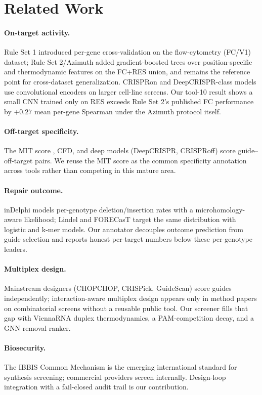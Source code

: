 \documentclass[12pt]{article}
\begin{document}
\section{Related Work}
\paragraph{On-target activity.} Rule Set 1 \cite{doench2014} introduced
per-gene cross-validation on the flow-cytometry (FC/V1) dataset; Rule Set
2/Azimuth \cite{doench2016} added gradient-boosted trees over position-specific
and thermodynamic features on the FC+RES union, and remains the reference
point for cross-dataset generalization. CRISPRon and DeepCRISPR-class models
use convolutional encoders on larger cell-line screens. Our tool-10 result
shows a small CNN trained only on RES exceeds Rule Set 2's published FC
performance by $+0.27$ mean per-gene Spearman under the Azimuth protocol
itself.
\paragraph{Off-target specificity.} The MIT score \cite{hsu2013}, CFD, and
deep models (DeepCRISPR, CRISPRoff) score guide--off-target pairs. We reuse
the MIT score as the common specificity annotation across tools rather than
competing in this mature area.
\paragraph{Repair outcome.} inDelphi \cite{shen2018} models per-genotype
deletion/insertion rates with a microhomology-aware likelihood; Lindel
\cite{chen2019} and FORECasT target the same distribution with logistic and
k-mer models. Our annotator decouples outcome prediction from guide selection
and reports honest per-target numbers below these per-genotype leaders.
\paragraph{Multiplex design.} Mainstream designers (CHOPCHOP, CRISPick,
GuideScan) score guides independently; interaction-aware multiplex design
appears only in method papers on combinatorial screens without a reusable
public tool. Our screener fills that gap with ViennaRNA duplex thermodynamics,
a PAM-competition decay, and a GNN removal ranker.
\paragraph{Biosecurity.} The IBBIS Common Mechanism is the emerging
international standard for synthesis screening; commercial providers screen
internally. Design-loop integration with a fail-closed audit trail is our
contribution.
\end{document}
